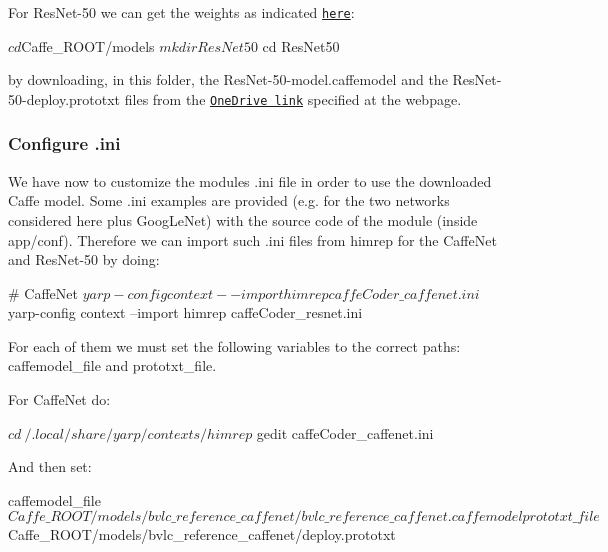 For {\ttfamily Res\+Net-\/50} we can get the weights as indicated \href{https://github.com/KaimingHe/deep-residual-networks}{\tt here}\+:


\begin{DoxyCode}
$ cd $Caffe\_ROOT/models
$ mkdir ResNet50
$ cd ResNet50
\end{DoxyCode}


by downloading, in this folder, the {\ttfamily Res\+Net-\/50-\/model.\+caffemodel} and the {\ttfamily Res\+Net-\/50-\/deploy.\+prototxt} files from the \href{https://onedrive.live.com/?authkey=%21AAFW2-FVoxeVRck&id=4006CBB8476FF777%2117887&cid=4006CBB8476FF777}{\tt One\+Drive link} specified at the webpage.

\subsubsection*{Configure .ini}

We have now to customize the module\textquotesingle{}s {\ttfamily .ini} file in order to use the downloaded Caffe model. Some {\ttfamily .ini} examples are provided (e.\+g. for the two networks considered here plus {\ttfamily Goog\+Le\+Net}) with the source code of the module (inside {\ttfamily app/conf}). Therefore we can import such {\ttfamily .ini} files from {\ttfamily himrep} for the {\ttfamily Caffe\+Net} and {\ttfamily Res\+Net-\/50} by doing\+:


\begin{DoxyCode}
# CaffeNet
$ yarp-config context --import himrep caffeCoder\_caffenet.ini
$ yarp-config context --import himrep caffeCoder\_resnet.ini
\end{DoxyCode}


For each of them we must set the following variables to the correct paths\+: {\ttfamily caffemodel\+\_\+file} and {\ttfamily prototxt\+\_\+file}.

For {\ttfamily Caffe\+Net} do\+:


\begin{DoxyCode}
$ cd ~/.local/share/yarp/contexts/himrep
$ gedit caffeCoder\_caffenet.ini
\end{DoxyCode}


And then set\+:


\begin{DoxyCode}
caffemodel\_file $Caffe\_ROOT/models/bvlc\_reference\_caffenet/bvlc\_reference\_caffenet.caffemodel
prototxt\_file $Caffe\_ROOT/models/bvlc\_reference\_caffenet/deploy.prototxt
\end{DoxyCode}


